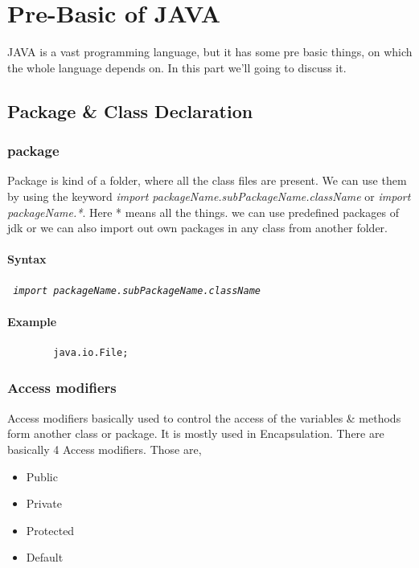 \documentclass[openany]{book}  %
\begin{document}
% 
% 
\part{Pre-Basic of JAVA}
\vspace*{\fill}
JAVA is a vast programming language, but it has some pre basic things, on which the whole
language depends on. In this part we'll going to discuss it.
\vspace*{\fill}
% 
% 
\chapter{Package \& Class Declaration}

% 
% 
\section{package}
Package is kind of a folder, where all the class files are present. We can use them by using the keyword \textit{import packageName.subPackageName.className} or
\textit{import packageName.*}. Here * means all the things. we can use predefined packages of jdk or we can also import out own packages in any class from another folder.
% 
% 
\subsection{Syntax}
\begin{center}
    \tt{
        \textit{import packageName.subPackageName.className}
    }
\end{center}
% 
% 
\subsection{Example}
\begin{center}
    \begin{verbatim}
        java.io.File;
    \end{verbatim}
\end{center}

% 
% 
\section{Access modifiers}
Access modifiers basically used to control the access of the variables \& methods form another class or package. It is mostly used in Encapsulation.
There are basically 4 Access modifiers. Those are,
\begin{itemize}
    \item Public
    \item Private
    \item Protected
    \item Default
\end{itemize}
% 
%
\end{document}
